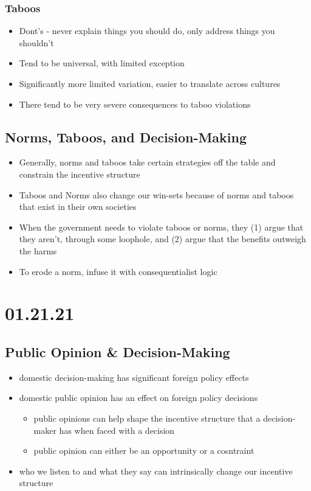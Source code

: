 \documentclass[11pt]{article}
\begin{document}
\subsubsection{Taboos}
\label{sec:orgf30cf52}
\begin{itemize}
\item Dont's - never explain things you should do, only address things you shouldn't
\item Tend to be universal, with limited exception
\item Significantly more limited variation, easier to translate across cultures
\item There tend to be very severe consequences to taboo violations
\end{itemize}
\subsection{Norms, Taboos, and Decision-Making}
\label{sec:org1e1c0fd}
\begin{itemize}
\item Generally, norms and taboos take certain strategies off the table and constrain the incentive structure
\item Taboos and Norms also change our win-sets because of norms and taboos that exist in their own societies
\item When the government needs to violate taboos or norms, they (1) argue that they aren't, through some loophole, and (2) argue that the benefits outweigh the harms
\item To erode a norm, infuse it with consequentialist logic
\end{itemize}
\section{01.21.21}
\label{sec:orgce75b60}
\subsection{Public Opinion \& Decision-Making}
\label{sec:org74ff500}
\begin{itemize}
\item domestic decision-making has significant foreign policy effects
\item domestic public opinion has an effect on foreign policy decisions
\begin{itemize}
\item public opinions can help shape the incentive structure that a decision-maker has when faced with a decision
\item public opinion can either be an opportunity or a cosntraint
\end{itemize}
\item who we listen to and what they say can intrinsically change our incentive structure
\end{itemize}
\end{document}
